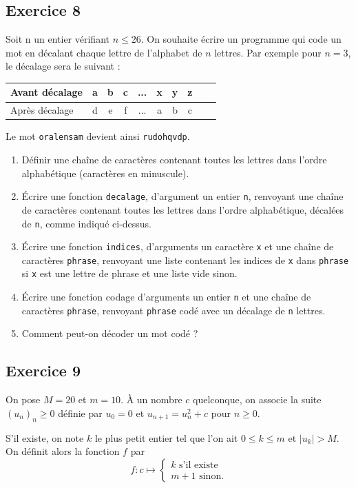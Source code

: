 \documentclass[10pt,fleqn]{article} %
\begin{document}
\begin{multicols}{2}
\subsection*{Exercice 8}
Soit n un entier vérifiant $n \leq 26$. On souhaite écrire un programme qui code un mot en décalant chaque lettre de l'alphabet de $n$ lettres.
Par exemple pour $n = 3$, le décalage sera le suivant :
\begin{center}
\begin{tabular}{|l|c|c|c|c|c|c|c|c|c|}
\hline
Avant décalage & a & b & c & ... & x & y & z \\
\hline
Après décalage & d & e & f & ... & a & b & c \\
\hline
\end{tabular}
\end{center}
Le mot \texttt{oralensam} devient ainsi \texttt{rudohqvdp}.
\begin{enumerate}
\item Définir une chaîne de caractères contenant toutes les lettres dans l’ordre alphabétique (caractères en
minuscule).
\item Écrire une fonction \texttt{decalage}, d’argument un entier \texttt{n}, renvoyant une chaîne de caractères contenant
toutes les lettres dans l’ordre alphabétique, décalées de \texttt{n}, comme indiqué ci-dessus.
\item Écrire une fonction \texttt{indices}, d’arguments un caractère \texttt{x} et une chaîne de caractères \texttt{phrase}, renvoyant
une liste contenant les indices de \texttt{x} dans \texttt{phrase} si \texttt{x} est une lettre de phrase et une liste vide sinon.
\item Écrire une fonction codage d’arguments un entier \texttt{n} et une chaîne de caractères \texttt{phrase}, renvoyant
\texttt{phrase} codé avec un décalage de \texttt{n} lettres.
\item Comment peut-on décoder un mot codé ?
\end{enumerate}




\subsection*{Exercice 9}

On pose $M = 20$ et $m = 10$. À un nombre $c$ quelconque, on associe la suite $(u_n)_n\geq 0$ définie par $u_0 = 0$ et $u_{n+1} = u_n^2 + c$ pour $n \geq 0$.

S’il existe, on note $k$ le plus petit entier tel que l’on ait $0 \leq k \leq m$ et $|u_k| > M$.
On définit alors la fonction $f$ par 
$$
f : c \mapsto 
\left\{
\begin{array}{l}
k \text{ s'il existe} \\
m+1  \text{ sinon.}
\end{array}
\right.
$$


\end{multicols}
\end{document}
